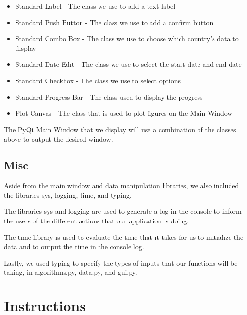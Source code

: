 \documentclass[fontsize=11pt]{article}
\begin{document}
    \begin{itemize}
        \item Standard Label - The class we use to add a text label
        \item Standard Push Button - The class we use to add a confirm button
        \item Standard Combo Box - The class we use to choose which country's data to display
        \item Standard Date Edit - The class we use to select the start date and end date
        \item Standard Checkbox - The class we use to select options
        \item Standard Progress Bar - The class used to display the progress
        \item Plot Canvas - The class that is used to plot figures on the Main Window
    \end{itemize}

    The PyQt Main Window that we display will use a combination of the classes above to output the desired window.

    \subsection{Misc}

    Aside from the main window and data manipulation libraries, we also included the libraries sys, logging, time, and typing.

    The libraries sys and logging are used to generate a log in the console to inform the users of the different actions that our application is doing.

    The time library is used to evaluate the time that it takes for us to initialize the data and to output the time in the console log.

    Lastly, we used typing to specify the types of inputs that our functions will be taking, in algorithms.py, data.py, and gui.py.

    \newpage

    \section{Instructions}
\end{document}

